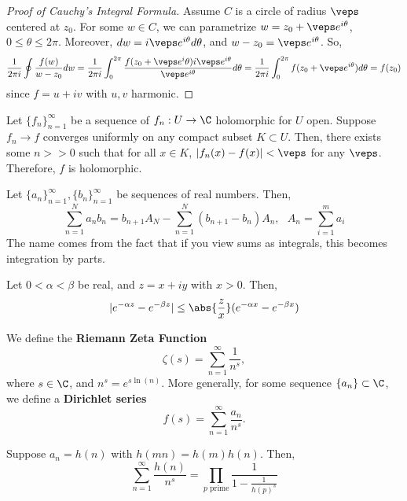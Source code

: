 \begin{proof}[Proof of Cauchy's Integral Formula]
    Assume $C$ is a circle of radius $\veps$ centered at $z_0$. For some $w \in C$, we can parametrize $w = z_0+\veps e^{i\theta}$, $0 \leq \theta \leq 2\pi$. Moreover, $dw = i\veps e^{i\theta}d \theta$, and $w-z_0 = \veps e^{i\theta}$. So,
    $$\frac{1}{2 \pi i}\oint \frac{f(w)}{w-z_0}dw=\frac{1}{2 \pi i}\int_0^{2\pi}\frac{f(z_0+\veps e^{i}\theta)i\veps e^{i\theta}}{\veps e^{i\theta}}d \theta= \frac{1}{2\pi i }\int _0^{2\pi}f(z_0+\veps e^{i\theta})d\theta = f(z_0)$$
    since $f = u+iv$ with $u,v$ harmonic.
\end{proof}

\begin{lem}
    Let $\{f_n\}_{n=1}^\infty$ be a sequence of $f_n :U \to \C$ holomorphic for $U$ open. Suppose $f_n \to f$ converges uniformly on any compact subset $K \subset U$. Then, there exists some $n>>0$ such that for all $x \in K$, $|f_n(x) - f(x)| <\veps$ for any $\veps$. Therefore, $f$ is holomorphic.
\end{lem}

\begin{lem}
    Let $\{a_n\}_{n=1}^\infty,\{b_n\}_{n=1}^\infty$ be sequences of real numbers. Then,
    $$\sum_{n=1}^Na_nb_n=b_{n+1}A_N - \sum_{n=1}^N (b_{n+1}-b_n)A_n,\:\:\: A_n = \sum_{i=1}^ma_i$$
    The name comes from the fact that if you view sums as integrals, this becomes integration by parts.
\end{lem}

\begin{lem}
    Let $0 < \alpha < \beta$ be real, and $z=x+iy$ with $x>0$. Then,
    $$|e^{-\alpha z}-e^{-\beta z}|\leq \abs{\frac{z}{x}}(e^{-\alpha x}-e^{-\beta x})$$
\end{lem}

\begin{defn}
    We define the \textbf{Riemann Zeta Function}
    $$\zeta (s) = \sum_{n=1}^\infty \frac{1}{n^s},$$
    where $s \in \C$, and $n^s = e^{s \ln (n)}$. More generally, for some sequence $\{a_n\} \subset \C$, we define a \textbf{Dirichlet series}
    $$f(s) = \sum_{n=1}^\infty \frac{a_n}{n^s}.$$
\end{defn}

\begin{prop}
    Suppose $a_n = h(n)$ with $h(mn)=h(m)h(n)$. Then,
    $$ \sum_{n=1}^\infty \frac{h(n)}{n^s}=\prod_{p\text{ prime}}\frac{1}{1-\frac{1}{h(p)^s}}$$
\end{prop}

